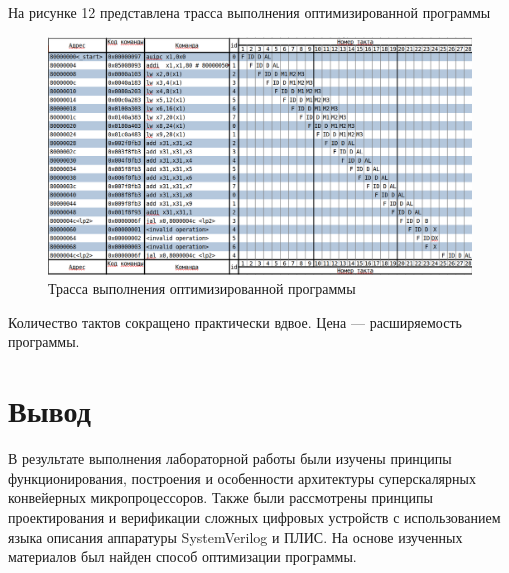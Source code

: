 На рисунке 12 представлена трасса выполнения оптимизированной программы
\FloatBarrier
\begin{figure}[h]
	\includegraphics[width=\linewidth]{inc/opt.png}
	\caption{Трасса выполнения оптимизированной программы}
\end{figure}
\FloatBarrier

Количество тактов сокращено практически вдвое. Цена — расширяемость
программы.

\section*{Вывод}
В результате выполнения лабораторной работы были изучены принципы
функционирования, построения и особенности архитектуры суперскалярных
конвейерных микропроцессоров. Также были рассмотрены принципы
проектирования и верификации сложных цифровых устройств с использованием
языка описания аппаратуры SystemVerilog и ПЛИС. На основе изученных
материалов был найден способ оптимизации программы. 